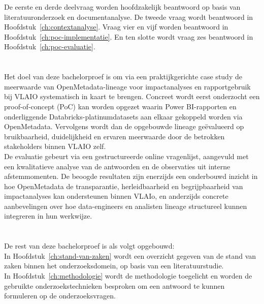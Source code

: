 De eerste en derde deelvraag worden hoofdzakelijk beantwoord op basis van literatuuronderzoek en documentanalyse. De tweede vraag wordt beantwoord in Hoofdstuk~\ref{ch:contextanalyse}. Vraag vier en vijf worden beantwoord in Hoofdstuk~\ref{ch:poc-implementatie}. En ten slotte wordt vraag zes beantwoord in Hoofdstuk~\ref{ch:poc-evaluatie}.

\section{}%
\label{sec:onderzoeksdoelstelling}

Het doel van deze bachelorproef is om via een praktijkgerichte case study de meerwaarde van OpenMetadata-lineage voor impactanalyses en rapportgebruik bij VLAIO systematisch in kaart te brengen. Concreet wordt eerst onderzocht een proof-of-concept (PoC) kan worden opgezet waarin Power BI-rap\-por\-ten en onderliggende Data\-bricks-pla\-ti\-num\-data\-sets aan elkaar gekoppeld worden via OpenMetadata. Vervolgens wordt dan de opgebouwde lineage geëvalueerd op bruikbaarheid, duidelijkheid en ervaren meerwaarde door de betrokken stakeholders binnen VLAIO zelf.\\

De evaluatie gebeurt via een gestructureerde online vragenlijst, aangevuld met een kwalitatieve analyse van de antwoorden en de observaties uit interne afstemmomenten. De beoogde resultaten zijn enerzijds een onderbouwd inzicht in hoe OpenMetadata de transparantie, herleidbaarheid en begrijpbaarheid van impactanalyses kan ondersteunen binnen VLAIo, en anderzijds concrete aanbevelingen over hoe data-engineers en analisten lineage structureel kunnen integreren in hun werkwijze.

\section{}%
\label{sec:opzet-bachelorproef}

De rest van deze bachelorproef is als volgt opgebouwd:\\

In Hoofdstuk~\ref{ch:stand-van-zaken} wordt een overzicht gegeven van de stand van zaken binnen het onderzoeksdomein, op basis van een literatuurstudie.\\

In Hoofdstuk~\ref{ch:methodologie} wordt de methodologie toegelicht en worden de gebruikte onderzoekstechnieken besproken om een antwoord te kunnen formuleren op de onderzoeksvragen.\\

